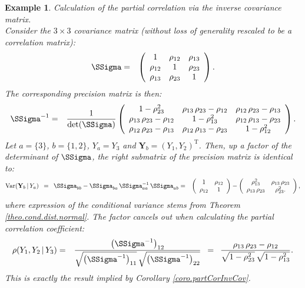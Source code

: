 \documentclass[a4paper]{article}
\theoremstyle{myexamplestyle}
\newtheorem{example}{Example}
\begin{document}
\begin{example} \label{exam.trivariateNormal}
\textit{Calculation of the partial correlation via the inverse covariance matrix.}
\\
Consider the $3 \times 3$ covariance matrix (without loss of generality rescaled to be a correlation matrix):
\begin{eqnarray*}
\SSigma & = & \left(
\begin{array}{ccc}
1 & \rho_{12} & \rho_{13} \\
\rho_{12} & 1 & \rho_{23} \\
\rho_{13} & \rho_{23} & 1
\end{array}
\right).
\end{eqnarray*}
The corresponding precision matrix is then:
\begin{eqnarray*}
\SSigma^{-1} & = & \frac{1}{\mbox{det}(\SSigma)} \left(
\begin{array}{ccc}
1 - \rho_{23}^2 & \rho_{13} \, \rho_{23} - \rho_{12} & \rho_{12} \, \rho_{23} - \rho_{13}  \\
\rho_{13} \, \rho_{23} - \rho_{12} & 1 - \rho_{13}^2 & \rho_{12} \, \rho_{13} - \rho_{23}  \\
\rho_{12} \, \rho_{23} - \rho_{13} & \rho_{12} \, \rho_{13} - \rho_{23} & 1 - \rho_{12}^2
\end{array}
\right).
\end{eqnarray*}
Let $a = \{ 3 \}$, $b = \{ 1, 2 \}$,  $Y_a = Y_3$ and $\mathbf{Y}_b = (Y_1, Y_2)^{\mathrm{T}}$. Then, up a factor of the determinant of $\SSigma$, the right submatrix of the precision matrix is identical to:
\begin{eqnarray*}
\mbox{Var}(\mathbf{Y}_b \, | \, Y_a) \, \, \, = \, \, \, \SSigma_{bb} - \SSigma_{ba} \, \SSigma_{aa}^{-1} \, \SSigma_{ab} & = & \left(
\begin{array}{cc}
1 & \rho_{12} \\
\rho_{12} & 1\\
\end{array}
\right) - \left(
\begin{array}{cc}
\rho_{13}^2 & \rho_{13} \, \rho_{23} \\
\rho_{13} \, \rho_{23} & \rho_{23}^2.
\end{array}
\right),
\end{eqnarray*}
where expression of the conditional variance stems from Theorem \ref{theo.cond.dist.normal}. The factor cancels out when calculating the partial correlation coefficient:
\begin{eqnarray*}
\rho (Y_1, Y_2 \, | \, Y_3) & = & \frac{\big( \SSigma^{-1} \big)_{12}}{\sqrt{ \big( \SSigma^{-1} \big)_{11} } \, \sqrt{ \big( \SSigma^{-1} \big)_{22} }}
\, \, \, = \, \, \,  \frac{\rho_{13} \, \rho_{23} - \rho_{12}}{\sqrt{1 - \rho_{23}^2} \, \sqrt{1 - \rho_{13}^2}}.
\end{eqnarray*}
This is exactly the result implied by Corollary \ref{coro.partCorInvCov}.
\end{example}
\end{document}
